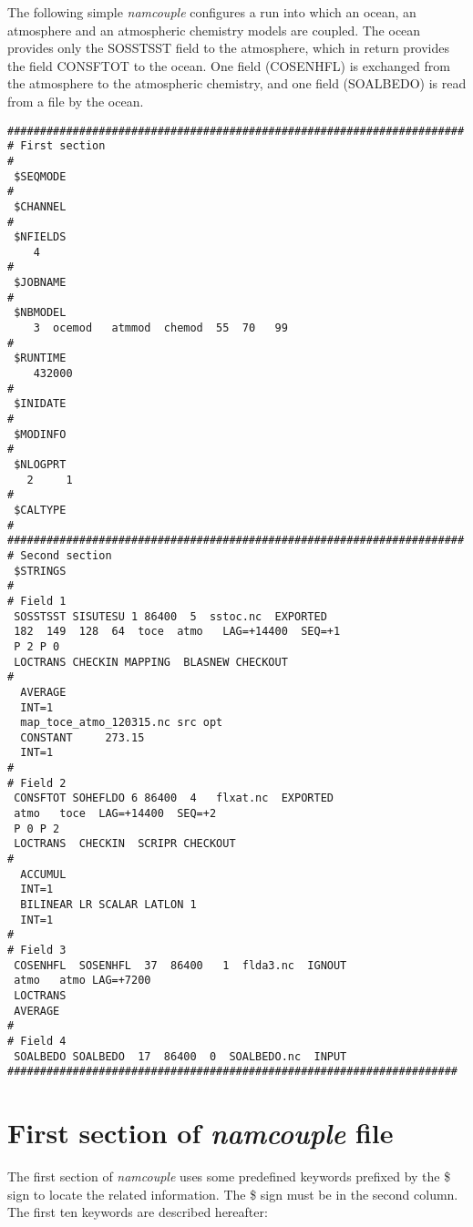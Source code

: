 The following simple {\it namcouple} configures a run into which an
ocean, an atmosphere and an atmospheric chemistry models are
coupled. The ocean provides only the SOSSTSST field to the atmosphere,
which in return provides the field CONSFTOT to the ocean. One field
(COSENHFL) is exchanged from the atmosphere to the atmospheric
chemistry, and one field (SOALBEDO) is read from a file by the ocean.

\begin{verbatim}
######################################################################
# First section
#
 $SEQMODE
#
 $CHANNEL
#
 $NFIELDS
    4  
#
 $JOBNAME
#
 $NBMODEL
    3  ocemod   atmmod  chemod  55  70   99 
#
 $RUNTIME
    432000
#
 $INIDATE
#
 $MODINFO
#
 $NLOGPRT
   2     1
#
 $CALTYPE
#
######################################################################
# Second section 
 $STRINGS
#
# Field 1
 SOSSTSST SISUTESU 1 86400  5  sstoc.nc  EXPORTED
 182  149  128  64  toce  atmo   LAG=+14400  SEQ=+1
 P 2 P 0
 LOCTRANS CHECKIN MAPPING  BLASNEW CHECKOUT 
#
  AVERAGE 
  INT=1
  map_toce_atmo_120315.nc src opt
  CONSTANT     273.15 
  INT=1
#
# Field 2
 CONSFTOT SOHEFLDO 6 86400  4   flxat.nc  EXPORTED
 atmo   toce  LAG=+14400  SEQ=+2
 P 0 P 2
 LOCTRANS  CHECKIN  SCRIPR CHECKOUT
#
  ACCUMUL 
  INT=1
  BILINEAR LR SCALAR LATLON 1
  INT=1
#
# Field 3
 COSENHFL  SOSENHFL  37  86400   1  flda3.nc  IGNOUT 
 atmo   atmo LAG=+7200 
 LOCTRANS
 AVERAGE
#
# Field 4
 SOALBEDO SOALBEDO  17  86400  0  SOALBEDO.nc  INPUT
#####################################################################
\end{verbatim}


\section{ First section of {\it namcouple} file}
\label{subsec_namcouplefirst}

The first section of {\it namcouple } uses some predefined keywords
prefixed by the \$ sign to locate the related information. The \$ sign
must be in the second column. The first ten keywords are described
hereafter:

